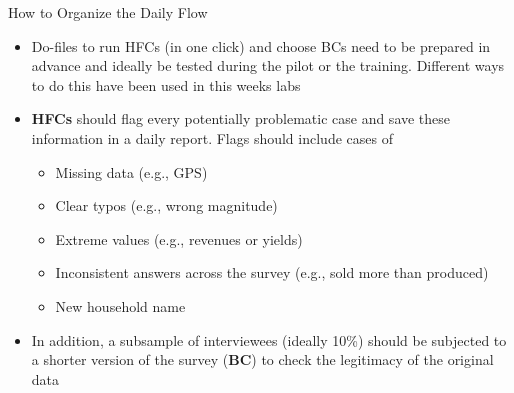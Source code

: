 \documentclass[aspectratio=169]{beamer}
\begin{document}
\begin{frame}{How to Organize the Daily Flow}

\begin{itemize}
    \setlength\itemsep{1em}
    
    \item Do-files to run HFCs (in one click) and choose BCs need to be prepared in advance and ideally be tested during the pilot or the training. Different ways to do this have been used in this weeks labs 
    
    \item \textbf{HFCs} should flag every potentially problematic case and save these information in a daily report. Flags should include cases of 
    \begin{itemize}
        \item Missing data (e.g., GPS)
        \item Clear typos (e.g., wrong magnitude)
        \item Extreme values (e.g., revenues or yields)
        \item Inconsistent answers across the survey (e.g., sold more than produced)
        \item New household name
    \end{itemize}

    \pause
    \item In addition, a subsample of interviewees (ideally 10\%) should be subjected to a shorter version of the survey (\textbf{BC}) to check the legitimacy of the original data
    
\end{itemize}
\end{frame}
\end{document}
